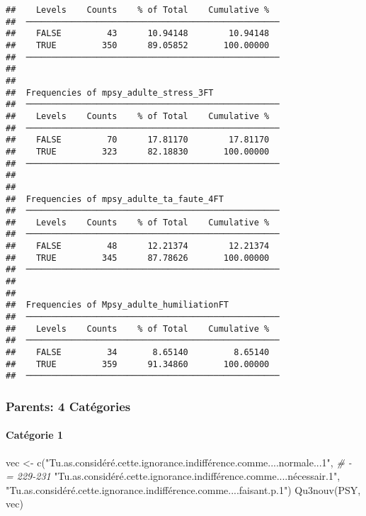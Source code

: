 \documentclass[
]{article}
\newenvironment{Shaded}{\begin{snugshade}}{\end{snugshade}}
\newcommand{\CommentTok}[1]{\textcolor[rgb]{0.56,0.35,0.01}{\textit{#1}}}
\newcommand{\FunctionTok}[1]{\textcolor[rgb]{0.00,0.00,0.00}{#1}}
\newcommand{\NormalTok}[1]{#1}
\newcommand{\OtherTok}[1]{\textcolor[rgb]{0.56,0.35,0.01}{#1}}
\newcommand{\StringTok}[1]{\textcolor[rgb]{0.31,0.60,0.02}{#1}}
\begin{document}
\begin{verbatim}
##    Levels    Counts    % of Total    Cumulative %   
##  ────────────────────────────────────────────────── 
##    FALSE         43      10.94148        10.94148   
##    TRUE         350      89.05852       100.00000   
##  ────────────────────────────────────────────────── 
## 
## 
##  Frequencies of mpsy_adulte_stress_3FT              
##  ────────────────────────────────────────────────── 
##    Levels    Counts    % of Total    Cumulative %   
##  ────────────────────────────────────────────────── 
##    FALSE         70      17.81170        17.81170   
##    TRUE         323      82.18830       100.00000   
##  ────────────────────────────────────────────────── 
## 
## 
##  Frequencies of mpsy_adulte_ta_faute_4FT            
##  ────────────────────────────────────────────────── 
##    Levels    Counts    % of Total    Cumulative %   
##  ────────────────────────────────────────────────── 
##    FALSE         48      12.21374        12.21374   
##    TRUE         345      87.78626       100.00000   
##  ────────────────────────────────────────────────── 
## 
## 
##  Frequencies of Mpsy_adulte_humiliationFT           
##  ────────────────────────────────────────────────── 
##    Levels    Counts    % of Total    Cumulative %   
##  ────────────────────────────────────────────────── 
##    FALSE         34       8.65140         8.65140   
##    TRUE         359      91.34860       100.00000   
##  ──────────────────────────────────────────────────
\end{verbatim}

\hypertarget{parents-4-catuxe9gories}{%
\subsubsection{Parents: 4 Catégories}\label{parents-4-catuxe9gories}}

\hypertarget{catuxe9gorie-1-2}{%
\paragraph{Catégorie 1}\label{catuxe9gorie-1-2}}

\begin{Shaded}
\begin{Highlighting}[]
\NormalTok{vec }\OtherTok{\textless{}{-}} \FunctionTok{c}\NormalTok{(}\StringTok{"Tu.as.considéré.cette.ignorance.indifférence.comme....normale...1"}\NormalTok{,  }\CommentTok{\# {-} = 229{-}231}
         \StringTok{"Tu.as.considéré.cette.ignorance.indifférence.comme....nécessair.1"}\NormalTok{,}
         \StringTok{"Tu.as.considéré.cette.ignorance.indifférence.comme....faisant.p.1"}\NormalTok{)}
\FunctionTok{Qu3nouv}\NormalTok{(PSY, vec)}
\end{Highlighting}
\end{Shaded}
\end{document}
